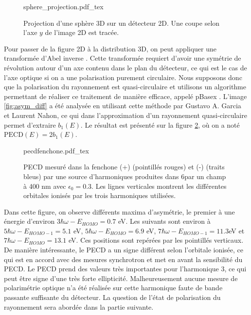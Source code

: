 \begin{figure}[!ht]
\centering
\def\svgwidth{0.6\columnwidth}
{sphere_projection.pdf_tex}
\caption{Projection d'une sphère 3D sur un détecteur 2D. Une coupe selon l'axe $y$ de l'image 2D est tracée.}
\label{fig:sphere_projection}
\end{figure}

Pour passer de la figure 2D à la distribution 3D, on peut appliquer une transformée d'Abel inverse . Cette transformée requiert d'avoir une symétrie de révolution autour d'un axe contenu dans le plan du détecteur, ce qui est le cas de l'axe optique si on a une polarisation purement circulaire. Nous supposons donc que la polarisation du rayonnement est quasi-circulaire et utilisons un algorithme permettant de réaliser ce traitement de manière efficace, appelé pBasex . L'image \ref{fig:asym_diff} a été analysée en utilisant cette méthode par Gustavo A. Garcia et Laurent Nahon, ce qui dans l'approximation d'un rayonnement quasi-circulaire permet d'extraire $b_1(E)$. Le résultat est présenté sur la figure \ref{fig:pecdfenchone}, où on a noté $\text{PECD}(E) = 2b_1(E)$.

\begin{figure}[!ht]
\centering
\def\svgwidth{1\columnwidth}
{pecdfenchone.pdf_tex}
\caption{PECD mesuré dans la fenchone (+) (pointillés rouges) et (-) (traits bleus) par une source d'harmoniques produites dans \sf6par un champ à 400 nm avec $\epsilon_0=0.3$. Les lignes verticales montrent les différentes orbitales ionisés par les trois harmoniques utilisées.}
\label{fig:pecdfenchone}
\end{figure}

Dans cette figure, on observe différents maxima d'asymétrie, le premier à une énergie d'environ $3\hbar\omega - E_{HOMO}= 0.7$ eV. Les suivants sont environ à $5\hbar\omega - E_{HOMO-1}= 5.1$ eV, $5\hbar\omega - E_{HOMO}= 6.9$ eV, $7\hbar\omega - E_{HOMO-1}= 11.3$eV et $7\hbar\omega - E_{HOMO}= 13.1$ eV. Ces positions sont repérées par les pointillés verticaux. De manière intéressante, le PECD a un signe différent selon l'orbitale ionisée, ce qui est en accord avec des mesures synchrotron  et met en avant la sensibilité du PECD. Le PECD prend des valeurs très importantes pour l'harmonique 3, ce qui peut être signe d'une très forte ellipticité. Malheureusement aucune mesure de polarimétrie optique n'a été réalisée sur cette harmonique faute de bande passante suffisante du détecteur. La question de l'état de polarisation du rayonnement sera abordée dans la partie suivante.


